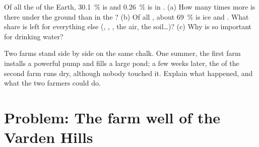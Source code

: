\begin{exercise}[$\star\star\star$]\label{exo:g6:water-underground:11}
Of all the  of the Earth, 30.1~\% is  and 0.26~\% is
in . (a) How many times more  is there under the ground
than in the ? (b) Of all , about 69~\% is ice and .
What share is left for everything else (, , , the air,
the soil\ldots)? (c) Why is  so important for drinking water?
\end{exercise}

\begin{exercise}[$\star\star\star$]\label{exo:g6:water-underground:12}
Two farms stand side by side on the same chalk. One summer, the first farm
installs a powerful pump and fills a large pond; a few weeks later, the
 of the second farm runs dry, although nobody touched it. Explain what
happened, and what the two farmers could do.
\end{exercise}

\section{Problem: The farm well of the Varden Hills}

